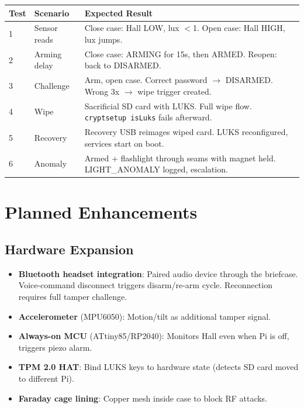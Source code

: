 \documentclass[11pt,letterpaper]{article}
\begin{document}
{\centering\begin{tabularx}{\textwidth}{L{1.0cm} L{3.0cm} Y}
\toprule
\textbf{Test} & \textbf{Scenario} & \textbf{Expected Result} \\
 & Sensor reads & Close case: Hall LOW, lux $<$1. Open case: Hall HIGH, lux jumps. \\
2 & Arming delay & Close case: ARMING for 15s, then ARMED. Reopen: back to DISARMED. \\
3 & Challenge & Arm, open case. Correct password $\rightarrow$ DISARMED. Wrong 3x $\rightarrow$ wipe trigger created. \\
4 & Wipe & Sacrificial SD card with LUKS. Full wipe flow. \texttt{cryptsetup isLuks} fails afterward. \\
5 & Recovery & Recovery USB reimages wiped card. LUKS reconfigured, services start on boot. \\
6 & Anomaly & Armed + flashlight through seams with magnet held. LIGHT\_ANOMALY logged, escalation. \\
\bottomrule
\end{tabularx}\par}


\section{Planned Enhancements}

\subsection{Hardware Expansion}
\begin{itemize}
  \item \textbf{Bluetooth headset integration}: Paired audio device through the briefcase. Voice-command disconnect triggers disarm/re-arm cycle. Reconnection requires full tamper challenge.
  \item \textbf{Accelerometer} (MPU6050): Motion/tilt as additional tamper signal.
  \item \textbf{Always-on MCU} (ATtiny85/RP2040): Monitors Hall even when Pi is off, triggers piezo alarm.
  \item \textbf{TPM 2.0 HAT}: Bind LUKS keys to hardware state (detects SD card moved to different Pi).
  \item \textbf{Faraday cage lining}: Copper mesh inside case to block RF attacks.
\end{itemize}
\end{document}
